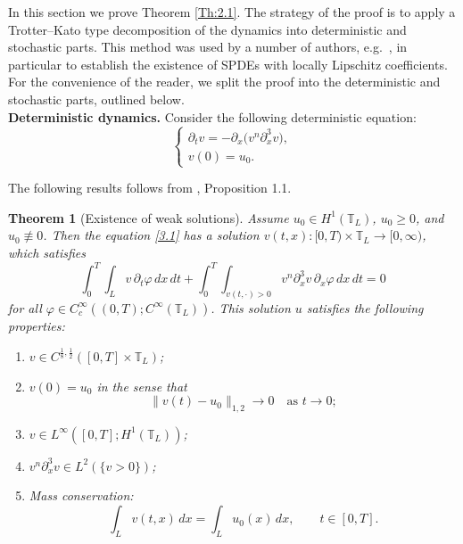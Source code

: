 \documentclass[a4paper,12pt]{article}
\newtheorem{theorem}[definition]{Theorem}
\numberwithin{equation}{section}
\begin{document}
In this section we prove Theorem \ref{Th:2.1}. The strategy of the proof is to apply a Trotter--Kato type decomposition of the dynamics into deterministic and stochastic parts. This method was used by a number of authors, e.g.\ \cite{Gess1,FisGru},
in particular to establish the existence of SPDEs with locally Lipschitz coefficients. For the convenience of the reader, we split the proof into the
deterministic and stochastic parts, outlined below.\\


{\bf Deterministic dynamics.} Consider the following deterministic equation:
\begin{equation}
\begin{cases}
\partial_t v = -\partial_x \bigl( v^n \partial_x^3 v \bigr), \\
v(0) = u_0.
\end{cases}
\label{3.1}
\end{equation}


The following results follows from \cite{DalPas}, Proposition 1.1.

\begin{theorem}[Existence of weak solutions]\label{Th:3.2}
Assume $u_0 \in H^1(\mathbb{T}_L)$, $u_0 \ge 0$, and $u_0 \not\equiv 0$.
Then the equation \eqref{3.1} has a solution 
$v(t,x): [0,T) \times \mathbb{T}_L \to [0, \infty)$, which satisfies
\begin{equation*}
\int_0^T \!\!\int_{L} v \,\partial_t \varphi \, dx\,dt
+ \int_0^T \!\!\int_{v(t, \cdot)>0}
v^n \partial_x^3 v \,\partial_x \varphi \, dx\,dt
= 0
\end{equation*}
for all $\varphi \in C_c^\infty((0,T); C^{\infty}(\mathbb{T}_L))$.
This solution $u$ satisfies the following properties:
\begin{enumerate}
\item $v \in C^{\frac18,\frac12}\!([0,T] \times \mathbb{T}_L)$;
\item $v(0)=u_0$ in the sense that
\[
\|v(t)-u_0\|_{1,2} \to 0 \quad \text{as } t\to 0; 
\]
\item $v \in L^\infty\!\left([0,T]; H^1(\mathbb{T}_L)\right)$;
\item $v^n \partial_x^3 v \in L^2(\{v>0\})$;
\item Mass conservation:
\[
\int_{L} v(t,x)\,dx
=
\int_{L} u_0(x)\,dx,
\qquad t\in[0,T].
\]
\end{enumerate}
\end{theorem}
\medskip
\end{document}
